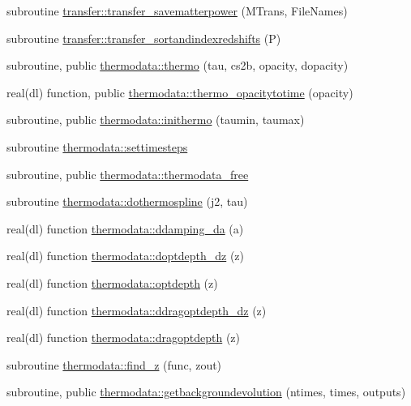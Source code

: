\begin{DoxyCompactItemize}
\item 
subroutine \mbox{\hyperlink{namespacetransfer_a4204b279b39e55f31b7948dec07fd7ed}{transfer\+::transfer\+\_\+savematterpower}} (M\+Trans, File\+Names)
\item 
subroutine \mbox{\hyperlink{namespacetransfer_a138e96e5b60355e8136607e26339b2a0}{transfer\+::transfer\+\_\+sortandindexredshifts}} (P)
\item 
subroutine, public \mbox{\hyperlink{namespacethermodata_a9ff7d8c599c64921c554cbc2069b3d2b}{thermodata\+::thermo}} (tau, cs2b, opacity, dopacity)
\item 
real(dl) function, public \mbox{\hyperlink{namespacethermodata_ac4c3a9846b711f25cba7ce38322ee66b}{thermodata\+::thermo\+\_\+opacitytotime}} (opacity)
\item 
subroutine, public \mbox{\hyperlink{namespacethermodata_a6d995eb9ad9f563fec198222c168e097}{thermodata\+::inithermo}} (taumin, taumax)
\item 
subroutine \mbox{\hyperlink{namespacethermodata_a53958f3aa160bfde722bffb2b9d47df8}{thermodata\+::settimesteps}}
\item 
subroutine, public \mbox{\hyperlink{namespacethermodata_a29f627a601dcc5afc90dc9ea8e4d902a}{thermodata\+::thermodata\+\_\+free}}
\item 
subroutine \mbox{\hyperlink{namespacethermodata_a1c7e7a0884bd2117c1d24a1ce8d5aaf1}{thermodata\+::dothermospline}} (j2, tau)
\item 
real(dl) function \mbox{\hyperlink{namespacethermodata_a78b5c4ff5e2d2d472df5aae9bdd02d77}{thermodata\+::ddamping\+\_\+da}} (a)
\item 
real(dl) function \mbox{\hyperlink{namespacethermodata_afdafed82de5a75a5b609d945a91836fa}{thermodata\+::doptdepth\+\_\+dz}} (z)
\item 
real(dl) function \mbox{\hyperlink{namespacethermodata_a3875da8b58196788145c8f6df6ea6cfe}{thermodata\+::optdepth}} (z)
\item 
real(dl) function \mbox{\hyperlink{namespacethermodata_a3d2fe3077a350ae407ecb93f927b2cc4}{thermodata\+::ddragoptdepth\+\_\+dz}} (z)
\item 
real(dl) function \mbox{\hyperlink{namespacethermodata_ac14b857825ae37eee1107a320f7d71f7}{thermodata\+::dragoptdepth}} (z)
\item 
subroutine \mbox{\hyperlink{namespacethermodata_a402bcd30314032d575f841bf374ad320}{thermodata\+::find\+\_\+z}} (func, zout)
\item 
subroutine, public \mbox{\hyperlink{namespacethermodata_a94d40d05e68eca4db87b58269d19e6f3}{thermodata\+::getbackgroundevolution}} (ntimes, times, outputs)
\end{DoxyCompactItemize}

